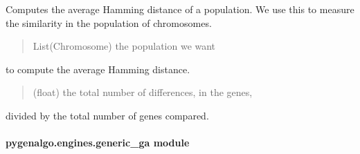 \documentclass[letterpaper,10pt,english]{sphinxmanual}
\begin{document}
\begin{fulllineitems}
\label{\detokenize{pygenalgo.engines:pygenalgo.engines.auxiliary.avg_hamming_dist}}
\pysigstartsignatures
{}
\pysigstopsignatures
\sphinxAtStartPar
Computes the average Hamming distance of a population. We use
this to measure the similarity in the population of chromosomes.
\begin{quote}\begin{description}
\sphinxAtStartPar
{} \textendash{} List(Chromosome) the population we want

\end{description}\end{quote}

\sphinxAtStartPar
to compute the average Hamming distance.
\begin{quote}\begin{description}
\sphinxAtStartPar
(float) the total number of differences, in the genes,

\end{description}\end{quote}

\sphinxAtStartPar
divided by the total number of genes compared.

\end{fulllineitems}



\paragraph{pygenalgo.engines.generic\_ga module}
\label{\detokenize{pygenalgo.engines:module-pygenalgo.engines.generic_ga}}\label{\detokenize{pygenalgo.engines:pygenalgo-engines-generic-ga-module}}
\end{document}
